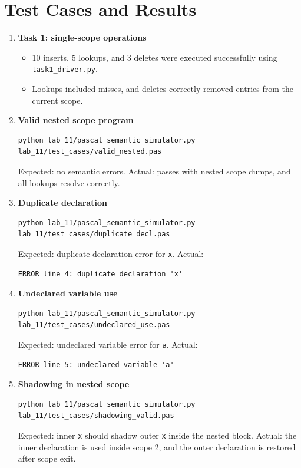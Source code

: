 \documentclass[11pt,a4paper]{article}
\begin{document}
\section*{Test Cases and Results}
\begin{enumerate}[leftmargin=*, itemsep=0.5em]
    \item \textbf{Task 1: single-scope operations}
    \begin{itemize}
        \item 10 inserts, 5 lookups, and 3 deletes were executed successfully using \texttt{task1\_driver.py}.
        \item Lookups included misses, and deletes correctly removed entries from the current scope.
    \end{itemize}

    \item \textbf{Valid nested scope program}
\begin{Verbatim}[fontsize=\small]
python lab_11/pascal_semantic_simulator.py lab_11/test_cases/valid_nested.pas
\end{Verbatim}
Expected: no semantic errors.
Actual: passes with nested scope dumps, and all lookups resolve correctly.

    \item \textbf{Duplicate declaration}
\begin{Verbatim}[fontsize=\small]
python lab_11/pascal_semantic_simulator.py lab_11/test_cases/duplicate_decl.pas
\end{Verbatim}
Expected: duplicate declaration error for \texttt{x}.
Actual:
\begin{Verbatim}[fontsize=\small]
ERROR line 4: duplicate declaration 'x'
\end{Verbatim}

    \item \textbf{Undeclared variable use}
\begin{Verbatim}[fontsize=\small]
python lab_11/pascal_semantic_simulator.py lab_11/test_cases/undeclared_use.pas
\end{Verbatim}
Expected: undeclared variable error for \texttt{a}.
Actual:
\begin{Verbatim}[fontsize=\small]
ERROR line 5: undeclared variable 'a'
\end{Verbatim}

    \item \textbf{Shadowing in nested scope}
\begin{Verbatim}[fontsize=\small]
python lab_11/pascal_semantic_simulator.py lab_11/test_cases/shadowing_valid.pas
\end{Verbatim}
Expected: inner \texttt{x} should shadow outer \texttt{x} inside the nested block.
Actual: the inner declaration is used inside scope 2, and the outer declaration is restored after scope exit.
\end{enumerate}
\end{document}
